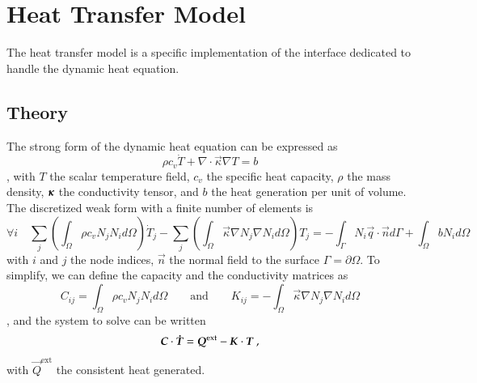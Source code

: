 \chapter{Heat Transfer Model}

The heat transfer model is a specific implementation of the  interface
dedicated to handle the dynamic heat equation.
\section{Theory}
The strong form of the dynamic heat equation
can be expressed as
\begin{equation}
  \rho c_v \dot{T} + \nabla \cdot \vec{\kappa} \nabla T = b
\end{equation}
, with $T$ the scalar temperature field,
$c_v$ the specific heat capacity,
$\rho$ the mass density,
$\boldsymbol{\kappa}$ the conductivity tensor, and $b$ the heat generation per unit of volume.
The discretized weak form with a finite number of elements is
\begin{equation}
  \forall i \quad
  \sum_j \left( \int_\Omega \rho c_v N_j N_i  d\Omega \right) \dot{T}_j
  - \sum_j \left( \int_\Omega \vec{\kappa} \nabla N_j \nabla N_i d\Omega \right) T_j =
  - \int_{\Gamma}  N_i \vec{q} \cdot \vec{n} d\Gamma + \int_\Omega b N_i d\Omega
\end{equation}
with $i$ and $j$ the node indices, $\vec{n}$ the normal field to the surface
$\Gamma = \partial \Omega$.
To simplify, we can define the capacity and the conductivity matrices as
\begin{equation}
  C_{ij} = \int_\Omega \rho c_v N_j N_i  d\Omega \qquad \textrm{and} \qquad
  K_{ij} = - \int_\Omega \vec{\kappa} \nabla N_j \nabla N_i d\Omega
\end{equation}
, and the system to solve can be written
\begin{equation}
  \boldsymbol{C} \cdot \boldsymbol{\dot{T}} = \boldsymbol{Q}^{\text{ext}} -\boldsymbol{K} \cdot \boldsymbol{T}~,
\end{equation}
with $\vec{Q}^{\text{ext}}$ the consistent heat generated.

